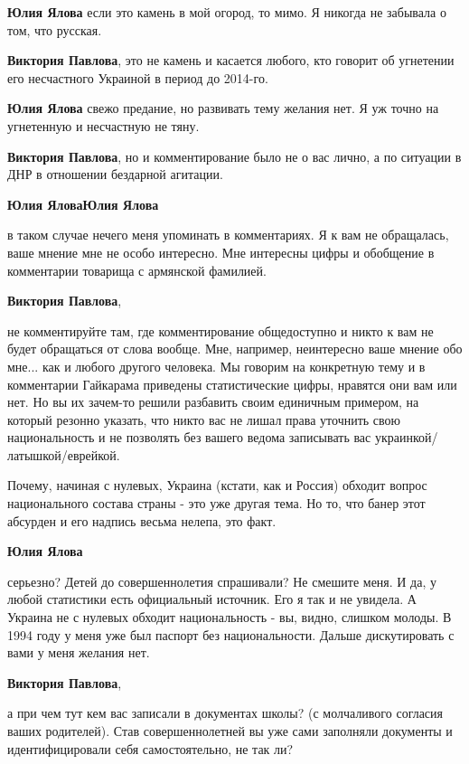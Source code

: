\begin{itemize}
\begin{itemize}
\textbf{Юлия Ялова} если это камень в мой огород, то мимо. Я никогда не забывала о том, что русская.

\textbf{Виктория Павлова}, это не камень и касается любого, кто говорит об угнетении его несчастного Украиной в период до 2014-го.

\textbf{Юлия Ялова} свежо предание, но развивать тему желания нет. Я уж точно на угнетенную и несчастную не тяну.

\textbf{Виктория Павлова}, но и комментирование было не о вас лично, а по ситуации в ДНР в отношении бездарной агитации.

\textbf{Юлия Ялова}\textbf{Юлия Ялова} 

в таком случае нечего меня упоминать в комментариях. Я к вам не обращалась,
ваше мнение мне не особо интересно. Мне интересны цифры и обобщение в
комментарии товарища с армянской фамилией.


\textbf{Виктория Павлова}, 

не комментируйте там, где комментирование общедоступно и никто к вам не будет
обращаться от слова вообще. Мне, например, неинтересно ваше мнение обо мне...
как и любого другого человека. Мы говорим на конкретную тему и в комментарии
Гайкарама приведены статистические цифры, нравятся они вам или нет. Но вы их
зачем-то решили разбавить своим единичным примером, на который резонно указать,
что никто вас не лишал права уточнить свою национальность и не позволять без
вашего ведома записывать вас украинкой/латышкой/еврейкой.

Почему, начиная с нулевых, Украина (кстати, как и Россия) обходит вопрос
национального состава страны - это уже другая тема. Но то, что банер этот
абсурден и его надпись весьма нелепа, это факт.

\textbf{Юлия Ялова} 

серьезно? Детей до совершеннолетия спрашивали? Не смешите меня. И да, у любой
статистики есть официальный источник. Его я так и не увидела. А Украина не с
нулевых обходит национальность - вы, видно, слишком молоды. В 1994 году у меня
уже был паспорт без национальности. Дальше дискутировать с вами у меня желания
нет.

\textbf{Виктория Павлова}, 

а при чем тут кем вас записали в документах школы? (с молчаливого согласия
ваших родителей). Став совершеннолетней вы уже сами заполняли документы и
идентифицировали себя самостоятельно, не так ли?


\end{itemize}
\end{itemize}
